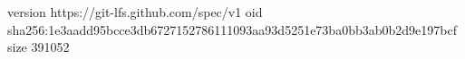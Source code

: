 version https://git-lfs.github.com/spec/v1
oid sha256:1e3aadd95bcce3db6727152786111093aa93d5251e73ba0bb3ab0b2d9e197bcf
size 391052
